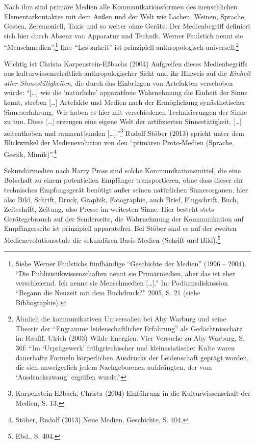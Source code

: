 \documentclass[a4paper,
fontsize=11pt,
oneside,
numbers=noperiodatend,
parskip=half-,
bibliography=totoc,
final
]{scrartcl}
\begin{document}
Nach ihm sind primäre Medien alle Kommunikationsformen des menschlichen
Elementarkontaktes mit dem Außen und der Welt wie Lachen, Weinen,
Sprache, Gesten, Zeremoniell, Taxis und so weiter ohne Geräte. Der
Medienbegriff definiert sich hier durch Absenz von Apparatur und
Technik. Werner Faulstich nennt sie \enquote{Menschmedien}.\footnote{Siehe
  Werner Faulstichs fünfbändige \enquote{Geschichte der Medien} (1996 --
  2004). \enquote{Die Publizistikwissenschaften nennt sie Primärmedien,
  aber das ist eher verschleiernd. Ich nenne sie Menschmedien
  {[}\ldots{}{]}.} In: Podiumsdiskussion \enquote{Begann die Neuzeit mit
  dem Buchdruck?} 2005, S. 21 (siehe Bibliographie).} Ihre
\enquote{Lesbarkeit} ist prinzipiell
anthropologisch-universell.\footnote{Ähnlich die kommunikativen
  Universalien bei Aby Warburg und seine Theorie der \enquote{Engramme
  leidenschaftlicher Erfahrung} als Gedächtnisschatz in: Raulff, Ulrich
  (2003) Wilde Energien. Vier Versuche zu Aby Warburg, S. 36f:
  \enquote{Im \enquote{Urprägewerk} frühgriechischer und
  kleinasiatischer Kulte waren dauerhafte Formeln körperlichen Ausdrucks
  der Leidenschaft geprägt worden, die sich unweigerlich jedem
  Nachgeborenen aufdrängten, der vom \enquote{Ausdruckszwang} ergriffen
  wurde.}}

Wichtig ist Christa Karpenstein-Eßbachs (2004) Aufgreifen dieses
Medienbegriffs aus kulturwissenschaftlich-anthropologischer Sicht und
ihr Hinweis auf die \emph{Einheit aller Sinnestätigkeiten}, die durch
das Einbringen von Artefakten verschoben würde: \enquote{{[}\ldots{}{]}
wie die \enquote{natürliche} apparatfreie Wahrnehmung die Einheit der
Sinne kennt, streben {[}\ldots{}{]} Artefakte und Medien nach der
Ermöglichung synästhetischer Sinneserfahrung. Wir haben es hier mit
verschiedenen Technisierungen der Sinne zu tun. Diese {[}\ldots{}{]}
erzeugen eine eigene Welt der artifizierten Sinnestätigkeit.
{[}\ldots{}{]} zeitenthoben und raumentbunden {[}\ldots{}{]}.}\footnote{Karpenstein-Eßbach,
  Christa (2004) Einführung in die Kulturwissenschaft der Medien, S. 13.}
Rudolf Stöber (2013) spricht unter dem Blickwinkel der Medienevolution
von den \enquote{primären Proto-Medien (Sprache, Gestik,
Mimik)}.\footnote{Stöber, Rudolf (2013) Neue Medien. Geschichte, S. 404.}

Sekundärmedien nach Harry Pross sind solche Kommunikationsmittel, die
eine Botschaft zu einem potentiellen Empfänger transportieren, ohne dass
dieser ein technisches Empfangsgerät benötigt außer seinen natürlichen
Sinnesorganen, hier also Bild, Schrift, Druck, Graphik, Fotographie,
auch Brief, Flugschrift, Buch, Zeitschrift, Zeitung, also Presse im
weitesten Sinne. Hier besteht stets Gerätegebrauch auf der Senderseite,
die Wahrnehmung der Kommunikation auf Empfängerseite ist prinzipiell
apparatefrei. Bei Stöber sind es auf der zweiten Medienevolutionsstufe
die sekundären Basis-Medien (Schrift und Bild).\footnote{Ebd., S. 404.}
\end{document}
